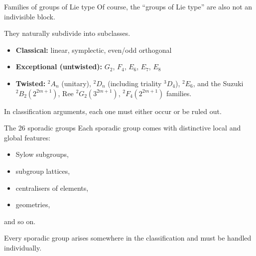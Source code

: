 \documentclass{beamer}
\begin{document}
\begin{frame}{Families of groups of Lie type}
Of course, the ``groups of Lie type'' are also not an indivisible block.

\medskip

They naturally subdivide into subclasses.

\bigskip

\begin{itemize}
  \item \textbf{Classical:} linear, symplectic, even/odd orthogonal
  \item \textbf{Exceptional (untwisted):} $G_2$, $F_4$, $E_6$, $E_7$, $E_8$
  \item \textbf{Twisted:} $^{2}A_n$ (unitary), $^{2}D_n$ (including triality $^{3}D_4$), $^{2}E_6$, and the Suzuki $^{2}B_2(2^{2m+1})$, Ree $^{2}G_2(3^{2m+1})$, $^{2}F_4(2^{2m+1})$ families.
\end{itemize}

\bigskip

In classification arguments, each one must either occur or be ruled out.
\end{frame}

\begin{frame}{The 26 sporadic groups}
Each sporadic group comes with distinctive local and global features:

\bigskip

\begin{itemize}
  \item Sylow subgroups,
  \item subgroup lattices,
  \item centralisers of elements,
  \item geometries,
\end{itemize}
and so on.

\bigskip

Every sporadic group arises somewhere in the classification and must be handled individually.
\end{frame}
\end{document}

